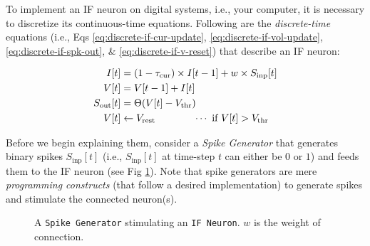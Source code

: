 To implement an IF neuron on digital systems, i.e., your computer, it is necessary to discretize its continuous-time equations. Following are the \textit{discrete-time} equations (i.e., Eqs \eqref{eq:discrete-if-cur-update}, \eqref{eq:discrete-if-vol-update}, \eqref{eq:discrete-if-spk-out}, \& \eqref{eq:discrete-if-v-reset}) that describe an IF neuron: 

\begin{highlight}
\vspace{-10pt}
\begin{align}
I[t] &= (1 - \tau_\text{cur})\times I[t-1] + w\times S_\text{inp}[t] \label{eq:discrete-if-cur-update} \\
V[t] &= V[t-1] + I[t] \label{eq:discrete-if-vol-update}\\
S_\text{out}[t] &= \Theta(V[t] - V_\text{thr}) \label{eq:discrete-if-spk-out} \\
V[t] &\leftarrow V_\text{rest} \text{\qquad\qquad$\cdots$ if $V[t]>V_\text{thr}$} \label{eq:discrete-if-v-reset}
\end{align}
\end{highlight}

Before we begin explaining them, consider a \textsl{Spike Generator} that generates binary spikes $S_\text{inp}[t]$ (i.e., $S_\text{inp}[t]$ at time-step $t$ can either be $0$ or $1$) and feeds them to the IF neuron (see Fig \ref{fig:spk-neuron:if}). Note that spike generators are mere \textit{programming constructs} (that follow a desired implementation) to generate spikes and stimulate the connected neuron(s).

\begin{figure}[h]
    \centering
\caption{A \texttt{Spike Generator} stimulating an \texttt{IF Neuron}. $w$ is the weight of connection.}
\label{fig:spk-neuron:if}
\end{figure}

